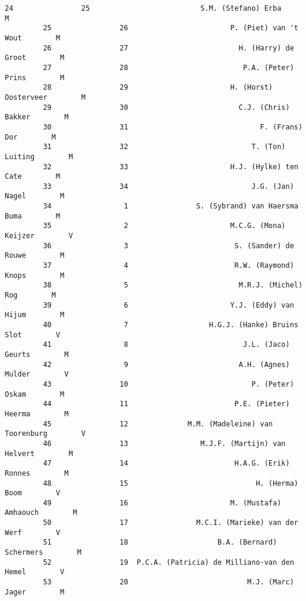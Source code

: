 \documentclass{article}
\begin{document}
\begin{Verbatim}[commandchars=\\\{\}]
         24                25                          S.M. (Stefano) Erba        M   
         25                26                        P. (Piet) van 't Wout        M   
         26                27                          H. (Harry) de Groot        M   
         27                28                           P.A. (Peter) Prins        M   
         28                29                        H. (Horst) Oosterveer        M   
         29                30                          C.J. (Chris) Bakker        M   
         30                31                               F. (Frans) Dor        M   
         31                32                             T. (Ton) Luiting        M   
         32                33                        H.J. (Hylke) ten Cate        M   
         33                34                             J.G. (Jan) Nagel        M   
         34                 1                S. (Sybrand) van Haersma Buma        M   
         35                 2                        M.C.G. (Mona) Keijzer        V   
         36                 3                         S. (Sander) de Rouwe        M   
         37                 4                         R.W. (Raymond) Knops        M   
         38                 5                          M.R.J. (Michel) Rog        M   
         39                 6                        Y.J. (Eddy) van Hijum        M   
         40                 7                   H.G.J. (Hanke) Bruins Slot        V   
         41                 8                           J.L. (Jaco) Geurts        M   
         42                 9                          A.H. (Agnes) Mulder        V   
         43                10                             P. (Peter) Oskam        M   
         44                11                         P.E. (Pieter) Heerma        M   
         45                12              M.M. (Madeleine) van Toorenburg        V   
         46                13                 M.J.F. (Martijn) van Helvert        M   
         47                14                         H.A.G. (Erik) Ronnes        M   
         48                15                              H. (Herma) Boom        V   
         49                16                        M. (Mustafa) Amhaouch        M   
         50                17                M.C.I. (Marieke) van der Werf        V   
         51                18                     B.A. (Bernard) Schermers        M   
         52                19  P.C.A. (Patricia) de Milliano-van den Hemel        V   
         53                20                            M.J. (Marc) Jager        M   

\end{Verbatim}
\end{document}
